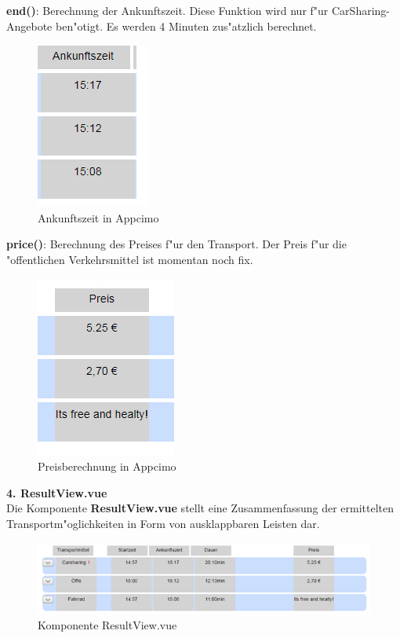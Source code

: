 \documentclass[a4paper, 11pt]{scrreprt}
\begin{document}
\textbf{end()}:  Berechnung der Ankunftszeit. Diese Funktion wird nur f"ur CarSharing-Angebote ben"otigt.  Es werden 4 Minuten zus"atzlich berechnet.

\begin{figure} [H]
\begin{center}
\includegraphics[scale=1]{end.png}
\caption{Ankunftszeit in Appcimo}
\label{end}
\end{center}
\end{figure}

\textbf{price()}:  Berechnung des Preises f"ur den Transport. Der Preis f"ur die "offentlichen Verkehrsmittel ist momentan noch fix. 

\begin{figure} [H]
\begin{center}
\includegraphics[scale=1]{price.png}
\caption{Preisberechnung in Appcimo}
\label{price}
\end{center}
\end{figure}

\textbf{4. ResultView.vue}\\

Die Komponente \textbf{ResultView.vue} stellt eine Zusammenfassung der ermittelten Transportm"oglichkeiten in Form von ausklappbaren Leisten dar. \\

\begin{figure} [H]
\begin{center}
\includegraphics[scale=1]{resultview.png}
\caption{Komponente ResultView.vue}
\label{resultview}
\end{center}
\end{figure}
\end{document}
